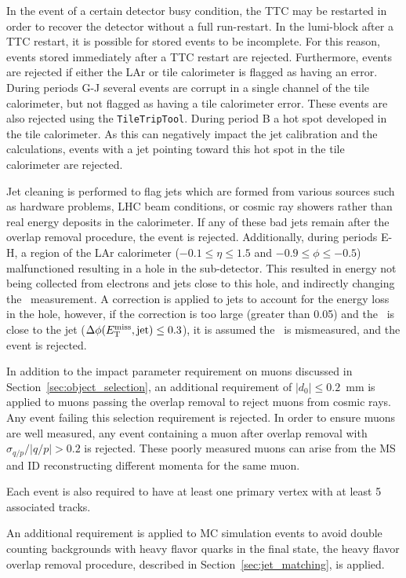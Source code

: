 In the event of a certain detector busy condition, the TTC may be restarted in
order to recover the detector without a full run-restart. In the lumi-block
after a TTC restart, it is possible for stored events to be incomplete.
For this reason, events stored immediately after a TTC restart are rejected.
Furthermore, events are rejected if either the LAr or tile calorimeter is
flagged as having an error.
During periods G-J several events are corrupt in a single channel of the tile
calorimeter, but not flagged as having a tile calorimeter error.
These events are also rejected using the \texttt{TileTripTool}.
During period B a hot spot developed in the tile calorimeter.
As this can negatively impact the jet calibration and the \met calculations,
events with a jet pointing toward this hot spot in the tile calorimeter are
rejected.

Jet cleaning is performed to flag jets which are formed from various sources
such as hardware problems, LHC beam conditions, or cosmic ray showers rather
than real energy deposits in the calorimeter.
If any of these bad jets remain after the overlap removal procedure, the event
is rejected.
Additionally, during periods E-H, a region of the LAr
calorimeter ($-0.1\le\eta\le1.5$ and $-0.9\le\phi\le-0.5$) malfunctioned
resulting in a hole in the sub-detector.
This resulted in energy not being collected from electrons and jets close to
this hole, and indirectly changing the \met\ measurement.
A correction is applied to jets to account for the energy loss in the hole,
however, if the correction is too large (greater than 0.05) and the \met\ is
close to the jet ($\Delta\phi(E_{\mathrm{T}}^{\mathrm{miss}}, \text{jet}) \le 0.3$), it is assumed the
\met\ is mismeasured, and the event is rejected.

In addition to the impact parameter requirement on muons discussed in
Section~\ref{sec:object_selection}, an additional requirement of
$|d_0| \leq 0.2$~mm is applied to muons passing the overlap removal to reject
muons from cosmic rays. Any event failing this selection requirement is
rejected.
In order to ensure muons are well measured, any event containing a muon after
overlap removal with $\sigma_{q/p}/|q/p| > 0.2$ is rejected.
These poorly measured muons can arise from the MS and ID reconstructing
different momenta for the same muon.

Each event is also required to have at least one primary vertex with at least
5 associated tracks.

An additional requirement is applied to MC simulation events to avoid double
counting backgrounds with heavy flavor quarks in the final state, the heavy
flavor overlap removal procedure, described in Section~\ref{sec:jet_matching},
is applied.

